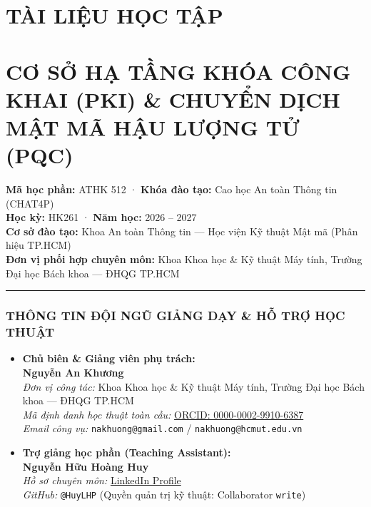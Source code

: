 \documentclass[
]{article}
\author{}
\date{}
\begin{document}
{
\setcounter{tocdepth}{3}
\tableofcontents
}
\section{TÀI LIỆU HỌC TẬP}\label{tuxe0i-liux1ec7u-hux1ecdc-tux1eadp}

\section{CƠ SỞ HẠ TẦNG KHÓA CÔNG KHAI (PKI) \& CHUYỂN DỊCH MẬT MÃ HẬU
LƯỢNG TỬ
(PQC)}\label{cux1a1-sux1edf-hux1ea1-tux1ea7ng-khuxf3a-cuxf4ng-khai-pki-chuyux1ec3n-dux1ecbch-mux1eadt-muxe3-hux1eadu-lux1b0ux1ee3ng-tux1eed-pqc}

\textbf{Mã học phần:} ATHK 512 · \textbf{Khóa đào tạo:} Cao học An toàn
Thông tin (CHAT4P)\\
\textbf{Học kỳ:} HK261 · \textbf{Năm học:} 2026 -- 2027\\
\textbf{Cơ sở đào tạo:} Khoa An toàn Thông tin --- Học viện Kỹ thuật Mật
mã (Phân hiệu TP.HCM)\\
\textbf{Đơn vị phối hợp chuyên môn:} Khoa Khoa học \& Kỹ thuật Máy tính,
Trường Đại học Bách khoa --- ĐHQG TP.HCM

\begin{center}\rule{0.5\linewidth}{0.5pt}\end{center}

\subsubsection{THÔNG TIN ĐỘI NGŨ GIẢNG DẠY \& HỖ TRỢ HỌC
THUẬT}\label{thuxf4ng-tin-ux111ux1ed9i-ngux169-giux1ea3ng-dux1ea1y-hux1ed7-trux1ee3-hux1ecdc-thuux1eadt}

\begin{itemize}
\item
  \textbf{Chủ biên \& Giảng viên phụ trách:}\\
  \textbf{Nguyễn An Khương}\\
  \emph{Đơn vị công tác:} Khoa Khoa học \& Kỹ thuật Máy tính, Trường Đại
  học Bách khoa --- ĐHQG TP.HCM\\
  \emph{Mã định danh học thuật toàn cầu:}
  \href{https://orcid.org/0000-0002-9910-6387}{ORCID:
  0000-0002-9910-6387}\\
  \emph{Email công vụ:} \texttt{nakhuong@gmail.com} /
  \texttt{nakhuong@hcmut.edu.vn}
\item
  \textbf{Trợ giảng học phần (Teaching Assistant):}\\
  \textbf{Nguyễn Hữu Hoàng Huy}\\
  \emph{Hồ sơ chuyên môn:}
  \href{https://www.linkedin.com/in/nguyen-huu-hoang-huy-abb138366/}{LinkedIn
  Profile}\\
  \emph{GitHub:} \texttt{@HuyLHP} (Quyền quản trị kỹ thuật: Collaborator
  \texttt{write})
\end{itemize}
\end{document}

